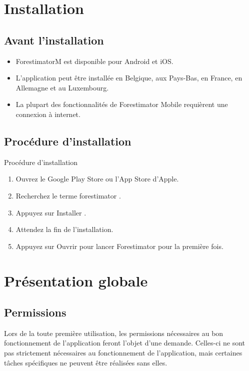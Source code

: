 \documentclass[12pt,a4paper]{report}
\begin{document}
\section{Installation}

\subsection{Avant l'installation}
\begin{itemize}
    \item \gls{ForestimatorM} est disponible pour Android et iOS.
    \item L'application peut être installée en Belgique, aux Pays-Bas, en France, en Allemagne et au Luxembourg.
    \item La plupart des fonctionnalités de Forestimator Mobile requièrent une connexion à internet.
\end{itemize}

\subsection{Procédure d'installation}
\begin{instructionbox}{Procédure d'installation}
\begin{enumerate}
    \item Ouvrez le Google Play Store ou l'App Store d'Apple.
    \item Recherchez le terme \og forestimator \fg.
    \item Appuyez sur \og Installer \fg.
    \item Attendez la fin de l'installation.
    \item Appuyez sur \og Ouvrir \fg{} pour lancer Forestimator pour la première fois.
\end{enumerate}
\end{instructionbox}

\section{Présentation globale}

\subsection{Permissions}
Lors de la toute première utilisation, les permissions nécessaires au bon fonctionnement de l'application feront l'objet d'une demande. Celles-ci ne sont pas strictement nécessaires au fonctionnement de l'application, mais certaines tâches spécifiques ne peuvent être réalisées sans elles.
\end{document}
